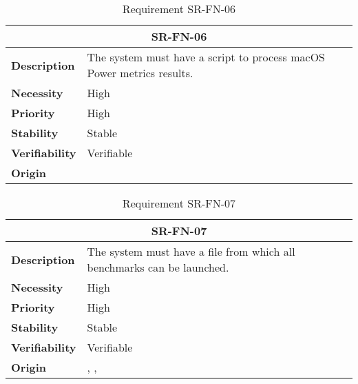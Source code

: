 \begin{table}[H]
    \centering
    \begin{tabular}{l p{10cm}}
        \toprule
        \multicolumn{2}{c}{SR-FN-06} \\
        \toprule
        \textbf{Description}        &  The system must have a script to process macOS Power metrics results. \\
        \textbf{Necessity}          &  High \\
        \textbf{Priority}           &  High \\
        \textbf{Stability}          &  Stable \\
        \textbf{Verifiability}      & Verifiable \\
        \textbf{Origin}             & \textit{\nameref{tab:ur-ca-05}} \\
    \end{tabular}
    \caption{Requirement SR-FN-06}
    \label{tab:sr-fn-06}
\end{table}

\begin{table}[H]
    \centering
    \begin{tabular}{l p{10cm}}
        \toprule
        \multicolumn{2}{c}{SR-FN-07} \\
        \toprule
        \textbf{Description}        &  The system must have a file from which all benchmarks can be launched. \\
        \textbf{Necessity}          &  High \\
        \textbf{Priority}           &  High \\
        \textbf{Stability}          &  Stable \\
        \textbf{Verifiability}      & Verifiable \\
        \textbf{Origin}             & \textit{\nameref{tab:ur-ca-05}}, \textit{\nameref{tab:ur-ca-14}}, \textit{\nameref{tab:ur-ca-17}} \\
    \end{tabular}
    \caption{Requirement SR-FN-07}
    \label{tab:sr-fn-07}
\end{table}


